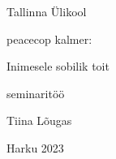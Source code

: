 \begin{titlepage}
\par{Tallinna Ülikool}
\vspace{0.3\textheight}
\par{peacecop kalmer:}
\LARGE
\par{Inimesele sobilik toit}
\normalsize
\par{seminaritöö}
\vspace{0.3\textheight}
\begin{flushright}
\par{Tiina Lõugas}
\end{flushright}
\vfill
Harku
\hfill
2023
\end{titlepage}
